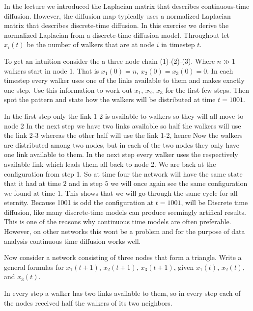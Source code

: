 In the lecture we introduced the Laplacian matrix that describes continuous-time diffusion. However, the diffusion map typically uses a normalized Laplacian matrix that describes discrete-time diffusion. In this exercise we derive the normalized Laplacian from a discrete-time diffusion model. Throughout let $x_i(t)$ be the number of walkers that are at node $i$ in timestep $t$. 

\subquestion
To get an intuition consider the a three node chain (1)-(2)-(3). Where $n\gg 1$  walkers start in node 1. That is $x_1(0)=n$, $x_2(0)=x_3(0)=0$. 
In each timestep every walker uses one of the links available to them and makes exactly one step. Use this information to work out $x_1$, $x_2$, $x_3$ for the first few steps. Then spot the pattern and state how the walkers will be distributed at time $t=1001$.

\solution
In the first step only the link 1-2 is available to walkers so they will all move to node 2 
In the next step we have two links available so half the walkers will use the link 2-3 whereas the other half will use the link 1-2, hence 
Now the walkers are distributed among two nodes, but in each of the two nodes they only have one link available to them. In the next step every walker uses the respectively available link which leads them all back to node 2. 
We are back at the configuration from step 1. So at time four the network will have the same state that it had at time $2$ and in step $5$ we will once again see the same configuration we found at time $1$. This shows that we will go through the same cycle for all eternity. Because 1001 is odd the configuration at $t=1001$, will be 
Discrete time diffusion, like many discrete-time models can produce seemingly artifical results. This is one of the reasons why continuous time models are often preferable. However, on other networks this wont be a problem and for the purpose of data analysis continuous time diffusion works well. 

\subquestion
Now consider a network consisting of three nodes that form a triangle. Write a general formulas for $x_1(t+1)$, $x_2(t+1)$, $x_3(t+1)$, given 
$x_1(t)$, $x_2(t)$, and $x_3(t)$.

\solution 
In every step a walker has two links available to them, so in every step each of the nodes received half the walkers of its two neighbors. 

